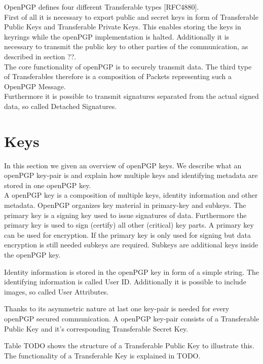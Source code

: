 OpenPGP defines four different Transferable types [RFC4880]. \\

First of all it is necessary to export public and secret keys in form of Transferable Public Keys and Transferable Private Keys. This enables storing the keys in keyrings while the openPGP implementation is halted. Additionally it is necessary to transmit the public key to other parties of the communication, as described in section ??.  \\

The core functionality of openPGP is to securely transmit data. The third type of Transferables therefore is a composition of Packets representing such a OpenPGP Message. \\

Furthermore it is possible to transmit signatures separated from the actual signed data, so called Detached Signatures.

\section{Keys}

In this section we given an overview of openPGP keys. We describe what an openPGP key-pair is and explain how multiple keys and identifying metadata are stored in one openPGP key. \\

A openPGP key is a composition of multiple keys, identity information and other metadata. OpenPGP organizes key material in primary-key and subkeys. The primary key is a signing key used to issue signatures of data. Furthermore the primary key is used to sign (certify) all other (critical) key parts. A primary key can be used for encryption. If the primary key is only used for  signing but data encryption is still needed subkeys are required. Subkeys are additional keys inside the openPGP key.

Identity information is stored in the openPGP key in form of a simple string. The identifying information is called User ID. Additionally it is possible to include images, so called User Attributes.

Thanks to its asymmetric nature at last one key-pair is needed for every openPGP secured communication. A openPGP key-pair consists of a Transferable Public Key and it's corresponding Transferable Secret Key. 

Table TODO shows the structure of a Transferable Public Key to illustrate this. The functionality of a Transferable  Key is explained in  TODO.

